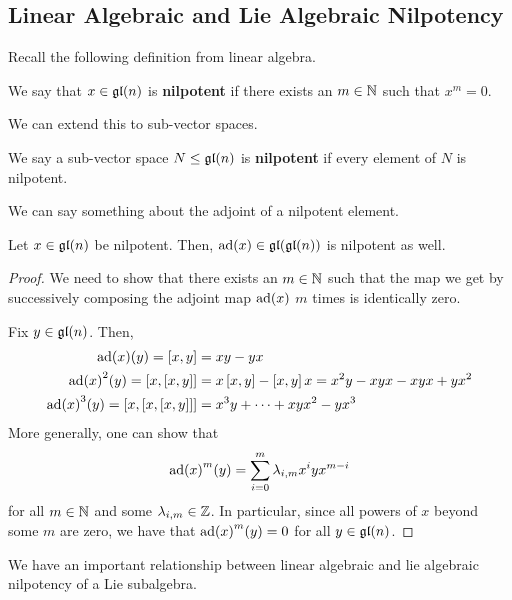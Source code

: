 \subsection{Linear Algebraic and Lie Algebraic Nilpotency}

Recall the following definition from linear algebra.

\begin{boxdefinition}
    We say that $x \in \mathfrak{gl}\!\left( n \right)$ is \textbf{nilpotent} if there exists an $m \in \mathbb{N}$ such that $x^m = 0$. 
\end{boxdefinition}

We can extend this to sub-vector spaces.

\begin{boxdefinition}
    We say a sub-vector space $N \leq \mathfrak{gl}\!\left( n \right)$ is \textbf{nilpotent} if every element of $N$ is nilpotent.
\end{boxdefinition}

We can say something about the adjoint of a nilpotent element.

\begin{lemma}\label{Ch1:Lemma:adNilpotnetOfNilpotent}
    Let $x \in \mathfrak{gl}\!\left( n \right)$ be nilpotent. Then, $\operatorname{ad}\!\left( x \right) \in \mathfrak{gl}\!\left( \mathfrak{gl}\!\left( n \right) \right)$ is nilpotent as well.
\end{lemma}
\begin{proof}
    We need to show that there exists an $m \in \mathbb{N}$ such that the map we get by successively composing the adjoint map $\operatorname{ad}\!\left( x \right)$ $m$ times is identically zero.
    
    Fix $y \in \mathfrak{gl}\!\left( n \right)$. Then,
    \begin{align*}
        \operatorname{ad}\!\left( x \right)\!(y) = \left[ x, y \right] &= xy - yx \\
        \operatorname{ad}\!\left( x \right)^2\!(y) = \left[ x, \left[ x, y \right] \right] &= x\left[ x, y \right] - \left[ x, y \right]x = x^2y - xyx - xyx + yx^2 \\
        \operatorname{ad}\!\left( x \right)^3\!(y) = \left[ x, \left[ x, \left[ x, y \right] \right] \right] &= x^3y + \cdots + xyx^2 - yx^3
    \end{align*}
    More generally, one can show that
    \begin{align*}
        \operatorname{ad}\!\left( x \right)^m\!(y) = \sum_{i = 0}^{m} \lambda_{i, m} x^i y x^{m - i}
    \end{align*}
    for all $m \in \mathbb{N}$ and some $\lambda_{i, m} \in \mathbb{Z}$. In particular, since all powers of $x$ beyond some $m$ are zero, we have that $\operatorname{ad}\!\left( x \right)^m\!(y) = 0$ for all $y \in \mathfrak{gl}\!\left( n \right)$.
\end{proof}

We have an important relationship between linear algebraic and lie algebraic nilpotency of a Lie subalgebra.

